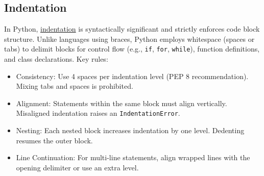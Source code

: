 \subsection*{Indentation}

In Python, 
\href{https://docs.python.org/3/reference/lexical_analysis.html\#indentation}{\color{DarkBlue}
indentation}
is syntactically significant and strictly enforces code block structure. Unlike languages using braces, 
Python employs whitespace (spaces or tabs) to delimit blocks for control flow (e.g., \texttt{if}, \texttt{for}, \texttt{while}), function definitions, and class declarations. Key rules:

\begin{itemize}
\item Consistency: Use 4 spaces per indentation level (PEP 8 recommendation). Mixing tabs and spaces is prohibited.
\item Alignment: Statements within the same block must align vertically. Misaligned indentation raises an \texttt{IndentationError}.
\item Nesting: Each nested block increases indentation by one level. Dedenting resumes the outer block.
\item Line Continuation: For multi-line statements, align wrapped lines with the opening delimiter or use an extra level.
\end{itemize}
